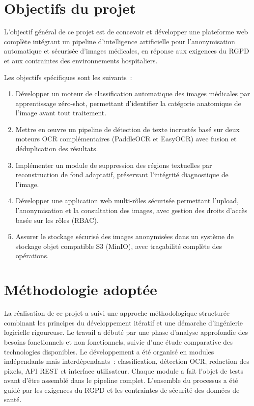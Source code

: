 \section*{Objectifs du projet}

L'objectif général de ce projet est de concevoir et développer une plateforme web complète intégrant un pipeline d'intelligence artificielle pour l'anonymisation automatique et sécurisée d'images médicales, en réponse aux exigences du RGPD et aux contraintes des environnements hospitaliers.

Les objectifs spécifiques sont les suivants~:
\begin{enumerate}
  \item Développer un moteur de classification automatique des images médicales par apprentissage zéro-shot, permettant d'identifier la catégorie anatomique de l'image avant tout traitement.
  \item Mettre en œuvre un pipeline de détection de texte incrustés basé sur deux moteurs OCR complémentaires (PaddleOCR et EasyOCR) avec fusion et déduplication des résultats.
  \item Implémenter un module de suppression des régions textuelles par reconstruction de fond adaptatif, préservant l'intégrité diagnostique de l'image.
  \item Développer une application web multi-rôles sécurisée permettant l'upload, l'anonymisation et la consultation des images, avec gestion des droits d'accès basée sur les rôles (RBAC).
  \item Assurer le stockage sécurisé des images anonymisées dans un système de stockage objet compatible S3 (MinIO), avec traçabilité complète des opérations.
\end{enumerate}

\section*{Méthodologie adoptée}

La réalisation de ce projet a suivi une approche méthodologique structurée combinant les principes du développement itératif et une démarche d'ingénierie logicielle rigoureuse. Le travail a débuté par une phase d'analyse approfondie des besoins fonctionnels et non fonctionnels, suivie d'une étude comparative des technologies disponibles. Le développement a été organisé en modules indépendants mais interdépendants~: classification, détection OCR, redaction des pixels, API REST et interface utilisateur. Chaque module a fait l'objet de tests avant d'être assemblé dans le pipeline complet. L'ensemble du processus a été guidé par les exigences du RGPD et les contraintes de sécurité des données de santé.

